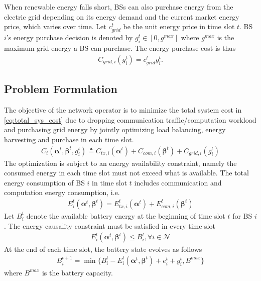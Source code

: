 \documentclass[12pt, draftclsnofoot, letterpaper, onecolumn]{IEEEtran}
\begin{document}
When renewable energy falls short, BSs can also purchase energy from the electric grid depending on its energy demand and the current market energy price, which varies over time. Let $c_{grid}^t$ be the unit energy price in time slot $t$. BS $i$'s energy purchase decision is denoted by $g^t_i \in [0, g^{max}]$ where $g^{max}$ is the maximum grid energy a BS can purchase. The energy purchase cost is thus
\begin{align}
C_{grid,i}(g^t_i) = c_{grid}^t g^t_i.
\end{align}


\subsection{Problem Formulation}
The objective of the network operator is to minimize the total system cost in \eqref{eq:total_sys_cost} due to dropping communication traffic/computation workload and purchasing grid energy by jointly optimizing load balancing, energy harvesting and purchase in each time slot.
\begin{align}\label{eq:total_sys_cost}
	C_i(\bm\alpha^t, \bm\beta^t, g^t_i) \triangleq C_{tx, i}(\bm\alpha^t) + C_{com, i}(\bm\beta^t) + C_{grid,i}(g^t_i)
\end{align}
 The optimization is subject to an energy availability constraint, namely the consumed energy in each time slot must not exceed what is available. The total energy consumption of BS $i$ in time slot $t$ includes communication and computation energy consumption, i.e.
\begin{align}
E_i^t(\bm\alpha^t, \bm{\beta}^t) = E_{tx, i}^t(\bm{\alpha}^t) + E_{com, i}^t(\bm{\beta}^t)
\end{align}
Let $B^t_i$ denote the available battery energy at the beginning of time slot $t$ for BS $i$. The energy causality constraint must be satisfied in every time slot
\begin{align}\label{causality}
E_i^t(\bm\alpha^t, \bm{\beta}^t) \leq B^t_i, \forall i \in \mathcal{N}
\end{align}
At the end of each time slot, the battery state evolves as follows
\begin{align}
B^{t+1}_i = \min\{B^t_i - E_i^t(\bm\alpha^t, \bm{\beta}^t) + e^t_i + g^t_i, B^{max}\} \label{dynamics}
\end{align}
where $B^{max}$ is the battery capacity.
\end{document}
